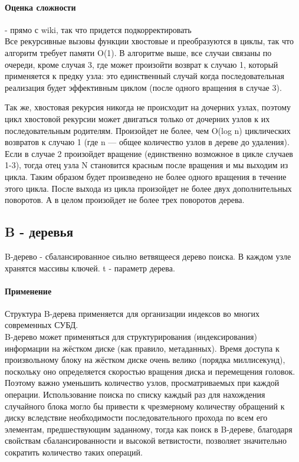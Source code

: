 \documentclass[a4paper,10pt]{article}
\begin{document}
\paragraph{Оценка сложности} - прямо с wiki, так что придется подкорректировать \\
Все рекурсивные вызовы функции хвостовые и преобразуются в циклы, так что алгоритм требует памяти O(1). В алгоритме выше, все случаи связаны по очереди, кроме случая 3, где может произойти возврат к случаю 1, который применяется к предку узла: это единственный случай когда последовательная реализация будет эффективным циклом (после одного вращения в случае 3).

Так же, хвостовая рекурсия никогда не происходит на дочерних узлах, поэтому цикл хвостовой рекурсии может двигаться только от дочерних узлов к их последовательным родителям. Произойдет не более, чем O(log n) циклических возвратов к случаю 1 (где n — общее количество узлов в дереве до удаления). Если в случае 2 произойдет вращение (единственно возможное в цикле случаев 1-3), тогда отец узла N становится красным после вращения и мы выходим из цикла. Таким образом будет произведено не более одного вращения в течение этого цикла. После выхода из цикла произойдет не более двух дополнительных поворотов. А в целом произойдет не более трех поворотов дерева.
\subsection{B - деревья}
B-дерево - сбалансированное сиьлно ветвящееся дерево поиска. В каждом узле хранятся массивы ключей. t - параметр дерева.
\paragraph{Применение}
Структура B-дерева применяется для организации индексов во многих современных СУБД.\\

B-дерево может применяться для структурирования (индексирования) информации на жёстком диске (как правило, метаданных). Время доступа к произвольному блоку на жёстком диске очень велико (порядка миллисекунд), поскольку оно определяется скоростью вращения диска и перемещения головок. Поэтому важно уменьшить количество узлов, просматриваемых при каждой операции. Использование поиска по списку каждый раз для нахождения случайного блока могло бы привести к чрезмерному количеству обращений к диску вследствие необходимости последовательного прохода по всем его элементам, предшествующим заданному, тогда как поиск в B-дереве, благодаря свойствам сбалансированности и высокой ветвистости, позволяет значительно сократить количество таких операций.\\
\end{document}
